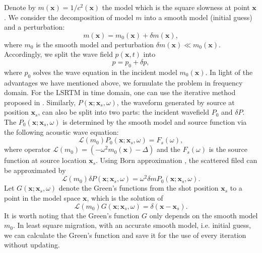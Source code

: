 \documentclass[11pt,titlepage]{article}
\newcommand{\cL}{\mathcal{L}}
\newcommand{\bx}{\boldsymbol{x}}
\theoremstyle{plain}
\theoremstyle{definition}
\theoremstyle{remark}
\numberwithin{equation}{section}
\begin{document}
Denote by $m(\bx)=1/c^2(\bx)$ the model which is the square slowness at point $\bx$. 
We consider the decomposition of model $m$ into a smooth model (initial guess) and a perturbation:
\begin{equation}
m(\bx)=m_0(\bx)+\delta m(\bx),
\end{equation} 
where $m_0$ is the smooth model and perturbation $\delta m(\bx) \ll m_0(\bx)$. Accordingly, we split the wave field $p(\bx,t)$ into 
\begin{equation}
p=p_0+\delta p,
\end{equation}
where $p_0$ solves the wave equation in the incident model $m_0(\bx)$.
In light of the advantages we have mentioned above, we formulate the problem in frequency domain. For the LSRTM in time domain, one can use the iterative method proposed in \cite{Dong:2012aa}.
Similarly, $P(\bx;\bx_s, \omega)$, the waveform generated by source at position $\bx_s$, can also be split into two parts: the incident wavefield $P_0$
and $\delta P$. The $P_0(\bx; \bx_s, \omega)$ is determined by the smooth model and source function via the following acoustic wave equation:
\begin{equation}
\cL( m_0) P_0(\bx; \bx_s, \omega)=F_s(\omega),
\end{equation} 
where operator $\cL( m_0)=(-\omega^2 m_0(\bx)-\Delta)$ and the $F_s(\omega)$ is the source function at source location $\bx_s$. 
Using Born approximation \cite{Tar1988}, the scattered filed can be approximated by  
\begin{equation}
\cL( m_0)\delta P(\bx;\bx_s,\omega) =\omega^2 \delta m P_0(\bx;\bx_s,\omega).
\end{equation}
Let $G(\bx; \bx_s, \omega)$ denote the Green's functions from the shot position $\bx_s$ to a point in the model space $\bx$, which is the solution of 
\begin{equation}
\cL(m_0)G(\bx;\bx_s,\omega)=\delta(\bx-\bx_s).
\end{equation}
It is worth noting that the Green's function $G$ only depends on the smooth model 
$m_0$. In least square migration, with an accurate smooth model, i.e. initial guess, we can calculate the Green's function and save it for the use of every iteration without updating. 
  
\end{document}
